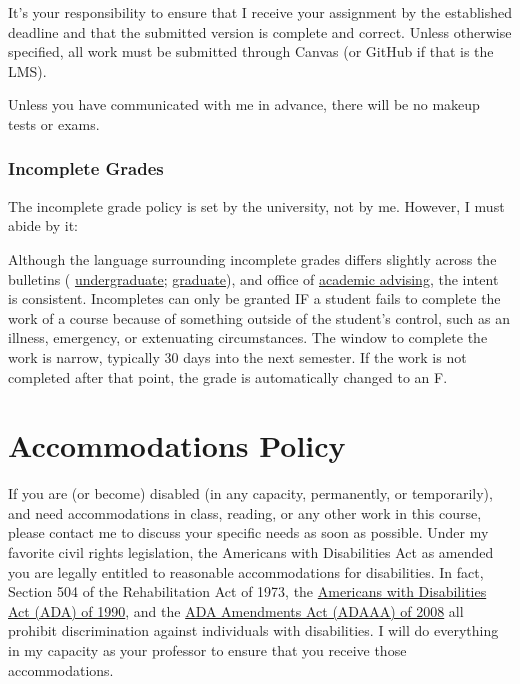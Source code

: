 \documentclass[
]{book}
\begin{document}
It's your responsibility to ensure that I receive your assignment by the established deadline and that the submitted version is complete and correct. Unless otherwise specified, all work must be submitted through Canvas (or GitHub if that is the LMS).

Unless you have communicated with me in advance, there will be no makeup tests or exams.

\subsection{Incomplete Grades}\label{incomplete-grades}

The incomplete grade policy is set by the university, not by me. However, I must abide by it:

Although the language surrounding incomplete grades differs slightly across the bulletins ( \href{https://bulletin.wfu.edu/undergraduate/procedures/exams-grading/\#:~:text=Incomplete\%20Grade}{undergraduate}; \href{https://bulletin.wfu.edu/graduate/procedures/grading/\#:~:text=Grade\%20of\%20I}{graduate}), and office of \href{https://advising.wfu.edu/academic-challenges/incompletes/}{academic advising}, the intent is consistent.
Incompletes can only be granted IF a student fails to complete the work of a course because of something outside of the student's control, such as an illness, emergency, or extenuating circumstances. The window to complete the work is narrow, typically 30 days into the next semester. If the work is not completed after that point, the grade is automatically changed to an F.

\chapter{Accommodations Policy}\label{accommodations-policy}

If you are (or become) disabled (in any capacity, permanently, or temporarily), and need accommodations in class, reading, or any other work in this course, please contact me to discuss your specific needs as soon as possible.
Under my favorite civil rights legislation, the Americans with Disabilities Act as amended you are legally entitled to reasonable accommodations for disabilities. In fact, Section 504 of the Rehabilitation Act of 1973, the \href{https://beta.ada.gov/}{Americans with Disabilities Act (ADA) of 1990}, and the \href{https://en.wikipedia.org/wiki/ADA_Amendments_Act_of_2008}{ADA Amendments Act (ADAAA) of 2008} all prohibit discrimination against individuals with disabilities.
I will do everything in my capacity as your professor to ensure that you receive those accommodations.
\end{document}
